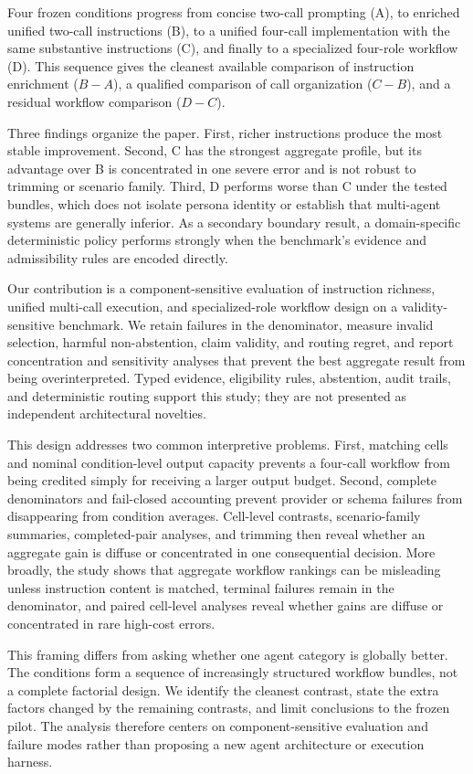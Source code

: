 Four frozen
conditions progress from concise two-call prompting (A), to enriched unified
two-call instructions (B), to a unified four-call implementation with the same
substantive instructions (C), and finally to a specialized four-role workflow
(D).  This sequence gives the cleanest available comparison of instruction
enrichment (\(B-A\)), a qualified comparison of call organization
(\(C-B\)), and a residual workflow comparison (\(D-C\)).

Three findings organize the paper.  First, richer instructions produce the
most stable improvement.  Second, C has the strongest aggregate profile, but
its advantage over B is concentrated in one severe error and is not robust to
trimming or scenario family.  Third, D performs worse than C under the tested
bundles, which does not isolate persona identity or establish that multi-agent
systems are generally inferior.  As a secondary boundary result, a
domain-specific deterministic policy performs strongly when the benchmark's
evidence and admissibility rules are encoded directly.

Our contribution is a component-sensitive evaluation of instruction richness,
unified multi-call execution, and specialized-role workflow design on a
validity-sensitive benchmark.  We retain failures in the denominator,
measure invalid selection, harmful non-abstention, claim validity, and routing
regret, and report concentration and sensitivity analyses that prevent the
best aggregate result from being overinterpreted.  Typed evidence, eligibility
rules, abstention, audit trails, and deterministic routing support this study;
they are not presented as independent architectural novelties.

This design addresses two common interpretive problems.  First, matching
cells and nominal condition-level output capacity prevents a four-call
workflow from being credited simply for receiving a larger output budget.
Second, complete denominators and fail-closed accounting prevent provider or
schema failures from disappearing from condition averages.  Cell-level
contrasts, scenario-family summaries, completed-pair analyses, and trimming
then reveal whether an aggregate gain is diffuse or concentrated in one
consequential decision.  More broadly, the study shows that aggregate workflow
rankings can be misleading unless instruction content is matched, terminal
failures remain in the denominator, and paired cell-level analyses reveal
whether gains are diffuse or concentrated in rare high-cost errors.

This framing differs from asking whether one agent category is globally
better.  The conditions form a sequence of increasingly structured workflow
bundles, not a complete factorial design.  We identify the cleanest contrast,
state the extra factors changed by the remaining contrasts, and limit
conclusions to the frozen pilot.  The analysis therefore centers on
component-sensitive evaluation and failure modes rather than proposing a new
agent architecture or execution harness.

